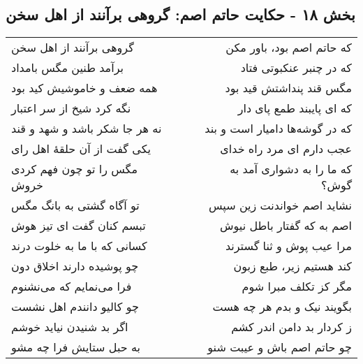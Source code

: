 \begin{center}
\section*{بخش ۱۸ - حکایت حاتم اصم: گروهی برآنند از اهل سخن}
\label{sec:018}
\begin{longtable}{l p{0.5cm} r}
گروهی برآنند از اهل سخن
&&
که حاتم اصم بود، باور مکن
\\
برآمد طنین مگس بامداد
&&
که در چنبر عنکبوتی فتاد
\\
همه ضعف و خاموشیش کید بود
&&
مگس قند پنداشتش قید بود
\\
نگه کرد شیخ از سر اعتبار
&&
که ای پایبند طمع پای دار
\\
نه هر جا شکر باشد و شهد و قند
&&
که در گوشه‌ها دامیار است و بند
\\
یکی گفت از آن حلقهٔ اهل رای
&&
عجب دارم ای مرد راه خدای
\\
مگس را تو چون فهم کردی خروش
&&
که ما را به دشواری آمد به گوش؟
\\
تو آگاه گشتی به بانگ مگس
&&
نشاید اصم خواندنت زین سپس
\\
تبسم کنان گفت ای تیز هوش
&&
اصم به که گفتار باطل نیوش
\\
کسانی که با ما به خلوت درند
&&
مرا عیب پوش و ثنا گسترند
\\
چو پوشیده دارند اخلاق دون
&&
کند هستیم زیر، طبع زبون
\\
فرا می‌نمایم که می‌نشنوم
&&
مگر کز تکلف مبرا شوم
\\
چو کالیو دانندم اهل نشست
&&
بگویند نیک و بدم هر چه هست
\\
اگر بد شنیدن نیاید خوشم
&&
ز کردار بد دامن اندر کشم
\\
به حبل ستایش فرا چه مشو
&&
چو حاتم اصم باش و عیبت شنو
\\
\end{longtable}
\end{center}
